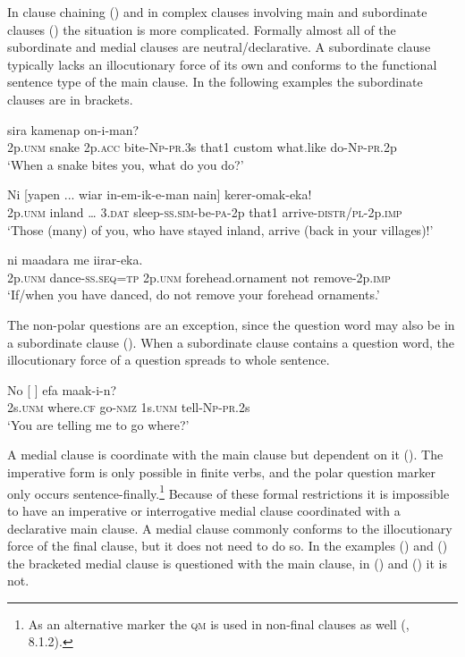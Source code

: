 In clause chaining () and in complex clauses involving main and subordinate clauses () the situation is more complicated. Formally almost all of the subordinate and medial clauses are neutral/declarative. A subordinate clause typically lacks an illocutionary force of its own \citep[32]{Cristofaro2003} and conforms to the functional sentence type of the main clause. In the following examples the subordinate clauses are in brackets.

\ea%
\label{ex:x1357}
  sira  kamenap on-i-man?\\
2p.\textsc{unm}  snake  2p.\textsc{acc}  bite-\textsc{Np}-\textsc{pr}.3s  that1  custom  what.like do-\textsc{Np}-\textsc{pr}.2p\\
\glt `When a snake bites you, what do you do?'
\z


\ea%
\label{ex:x1897}
\gll Ni  [yapen  ...  wiar  in-em-ik-e-man  nain] kerer-omak-eka!\\
2p.\textsc{unm}  inland  {\dots}  3.\textsc{dat}  sleep-\textsc{ss}.\textsc{sim}-be-\textsc{pa}-2p  that1 arrive-\textsc{distr/pl}-2p.\textsc{imp}\\
\glt `Those (many) of you, who have stayed inland, arrive (back in your villages)!'
\z


\ea%
\label{ex:x1898}
\gll [Ni  uf-ep-na]  ni  maadara  me iirar-eka.\\
2p.\textsc{unm} dance-\textsc{ss}.\textsc{seq}=\textsc{tp}  2p.\textsc{unm}  forehead.ornament  not remove-2p.\textsc{imp}\\
\glt `If/when you have danced, do not remove your forehead ornaments.'
\z

The non-polar questions are an exception, since the question word may also be in a subordinate clause (). When a subordinate clause contains a question word, the illocutionary force of a question spreads to whole sentence. 

\ea%
\label{ex:x1362}
\gll No  [  ]  efa  maak-i-n?\\
2s.\textsc{unm}  where.\textsc{cf}  go-\textsc{nmz}  1s.\textsc{unm}  tell-\textsc{Np}-\textsc{pr}.2s\\
\glt `You are telling me to go where?'
\z

A medial clause is coordinate with the main clause but dependent on it (). The imperative form is only possible in finite verbs, and the polar question marker only occurs sentence-finally.\footnote{As an alternative marker the \textsc{qm} is used in non-final clauses as well (, 8.1.2).} Because of these formal restrictions it is impossible to have an imperative or interrogative medial clause coordinated with a declarative main clause. A medial clause commonly conforms to the illocutionary force of the final clause, but it does not need to do so. In the examples () and () the bracketed medial clause is questioned with the main clause, in () and () it is not.  

